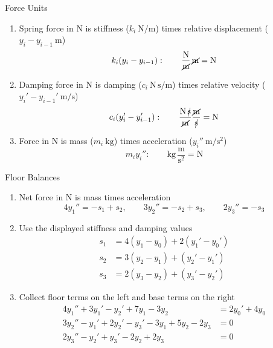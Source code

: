 \begin{frame}{Force Units}
\begin{enumerate}
  \item Spring force in $\mathrm{N}$ is stiffness ($k_i\ \mathrm{N/m}$) times relative displacement ($y_i-y_{i-1}\ \mathrm{m}$)
  \[
    k_i(y_i-y_{i-1}):\qquad
    \frac{\mathrm{N}}{\cancel{\mathrm{m}}}\,\cancel{\mathrm{m}}=\mathrm{N}
  \]
  \item Damping force in $\mathrm{N}$ is damping ($c_i\ \mathrm{N\,s/m}$) times relative velocity ($y_i'-y_{i-1}'\ \mathrm{m/s}$)
  \[
    c_i(y_i'-y_{i-1}'):\qquad
    \frac{\mathrm{N}\,\cancel{\mathrm{s}}}{\cancel{\mathrm{m}}}
    \frac{\cancel{\mathrm{m}}}{\cancel{\mathrm{s}}}=\mathrm{N}
  \]
  \item Force in $\mathrm{N}$ is mass ($m_i\ \mathrm{kg}$) times acceleration ($y_i''\ \mathrm{m/s^2}$)
  \[
    m_i y_i'':\qquad
    \mathrm{kg}\,\frac{\mathrm{m}}{\mathrm{s}^2}=\mathrm{N}
  \]
\end{enumerate}
\end{frame}
\begin{frame}{Floor Balances}
\begin{enumerate}
  \item Net force in $\mathrm{N}$ is mass times acceleration
  \[
    4y_1''=-s_1+s_2,\qquad
    3y_2''=-s_2+s_3,\qquad
    2y_3''=-s_3
  \]
  \item Use the displayed stiffness and damping values
  \[
    \begin{aligned}
      s_1&=4(y_1-y_0)+2(y_1'-y_0')\\
      s_2&=3(y_2-y_1)+(y_2'-y_1')\\
      s_3&=2(y_3-y_2)+(y_3'-y_2')
    \end{aligned}
  \]
  \item Collect floor terms on the left and base terms on the right
  \[
    \begin{aligned}
      4y_1''+3y_1'-y_2'+7y_1-3y_2&=2y_0'+4y_0\\
      3y_2''-y_1'+2y_2'-y_3'-3y_1+5y_2-2y_3&=0\\
      2y_3''-y_2'+y_3'-2y_2+2y_3&=0
    \end{aligned}
  \]
\end{enumerate}
\end{frame}

